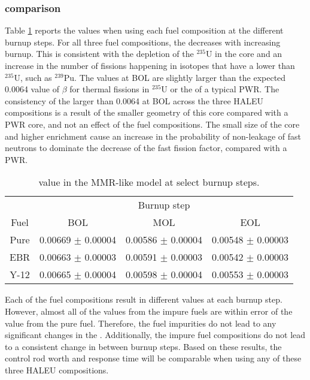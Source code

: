 \subsubsection{\betaEff comparison}
Table \ref{tab:mmr_betaeff} reports the \betaEff values when using 
each fuel composition at the different burnup steps. For all three 
fuel compositions, the \betaEff decreases with increasing burnup. This 
is consistent with the depletion of the $^{235}$U in the core and 
an increase in the number of fissions happening in isotopes
that have a lower \betaEff than $^{235}$U, such as $^{239}$Pu. 
The \betaEff values at \gls{BOL} are slightly larger 
than the expected 0.0064 value of $\beta$ for thermal fissions in $^{235}$U
or the \betaEff of a typical \gls{PWR}. The consistency of the \betaEff 
larger than 0.0064 at \gls{BOL} across the three \gls{HALEU} compositions 
is a result of the smaller geometry of this core compared with a 
\gls{PWR} core, and not an effect of the fuel compositions. 
The small size of the core and higher enrichment cause an 
increase in the probability of non-leakage of fast neutrons to 
dominate the decrease of the fast fission factor, compared with a \gls{PWR}. 

\begin{table}[ht]
        \centering
        \caption{\betaEff value in the \gls{MMR}-like model at 
        select burnup steps.}
        \label{tab:mmr_betaeff}
        \begin{tabular}{c c c c}
                \hline 
                 & \multicolumn{3}{c}{Burnup step}\\
                Fuel & \gls{BOL} & \gls{MOL} & \gls{EOL}\\
                \hline 
                Pure & 0.00669 $\pm$ 0.00004 & 0.00586 $\pm$ 0.00004 & 0.00548 $\pm$ 0.00003\\
                \gls{EBR} & 0.00663 $\pm$ 0.00003 & 0.00591 $\pm$ 0.00003 & 0.00542 $\pm$ 0.00003\\
                Y-12 & 0.00665 $\pm$ 0.00004 &  0.00598 $\pm$ 0.00004& 0.00553 $\pm$ 0.00003\\
                \hline 

        \end{tabular}
\end{table}

Each of the fuel compositions result in different \betaEff values at 
each burnup step. However, almost all of the values from the impure 
fuels are within error of the value from the pure fuel. Therefore, the 
fuel impurities do not lead to any significant changes in the 
\betaEff. Additionally, the impure fuel compositions do not lead to 
a consistent change in \betaEff between burnup steps. Based on 
these results, the control rod worth and response time will be 
comparable when using any of these three \gls{HALEU} compositions.

